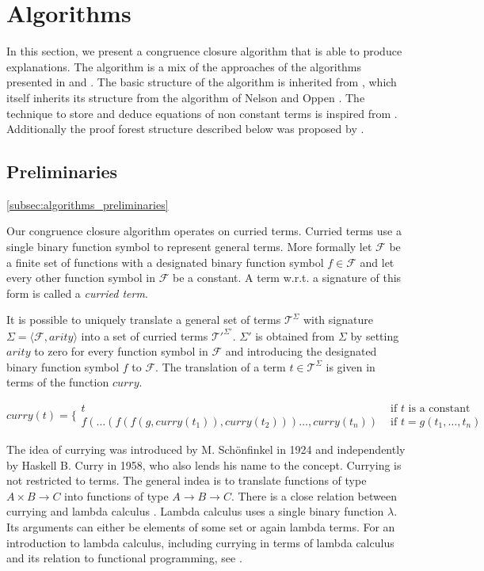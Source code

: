 \section*{Algorithms}
\label{sec:algorithm}



In this section, we present a congruence closure algorithm that is able to produce explanations.
The algorithm is a mix of the approaches of the algorithms presented in \cite{Fontaine2004} and \cite{Nieuwenhuis2005,Nieuwenhuis2007}.
The basic structure of the algorithm is inherited from \cite{Fontaine2004}, which itself inherits its structure from the algorithm of Nelson and Oppen \cite{Nelson1980}.
The technique to store and deduce equations of non constant terms is inspired from \cite{Nieuwenhuis2005,Nieuwenhuis2007}.
Additionally the proof forest structure described below was proposed by \cite{Nieuwenhuis2005,Nieuwenhuis2007}.

\subsection*{Preliminaries}
\ref{subsec:algorithms_preliminaries}

Our congruence closure algorithm operates on curried terms.
Curried terms use a single binary function symbol to represent general terms.
More formally let $\mathcal{F}$ be a finite set of functions with a designated binary function symbol $f \in \mathcal{F}$ and let every other function symbol in $\mathcal{F}$ be a constant.
A term w.r.t. a signature of this form is called a \emph{curried term}.

It is possible to uniquely translate a general set of terms $\mathcal{T}^{\Sigma}$ with signature $\Sigma = \langle \mathcal{F},arity \rangle$ into a set of curried terms $\mathcal{T'}^{\Sigma'}$.
$\Sigma'$ is obtained from $\Sigma$ by setting $arity$ to zero for every function symbol in $\mathcal{F}$ and introducing the designated binary function symbol $f$ to $\mathcal{F}$.
The translation of a term $t \in \mathcal{T}^{\Sigma}$ is given in terms of the function $curry$.

$$
curry(t) = \Big\{
\begin{array}{ll}
	t & \text{ if } t \text{ is a constant }\\
	f(\ldots (f(f(g,curry(t_1)),curry(t_2)))\ldots,curry(t_n)) &\text{ if } t = g(t_1,\ldots, t_n)
\end{array}
$$

The idea of currying was introduced by M. Sch\"onfinkel \cite{Schoenfinkel1924} in 1924 and independently by Haskell B. Curry \cite{Curry1958} in 1958, who also lends his name to the concept.
Currying is not restricted to terms.
The general indea is to translate functions of type $A \times B \rightarrow C$ into functions of type $A \rightarrow B \rightarrow C$.
There is a close relation between currying and lambda calculus \cite{Church1936}.
Lambda calculus uses a single binary function $\lambda$.
Its arguments can either be elements of some set or again lambda terms.
For an introduction to lambda calculus, including currying in terms of lambda calculus and its relation to functional programming, see \cite{Barendregt1997}.

